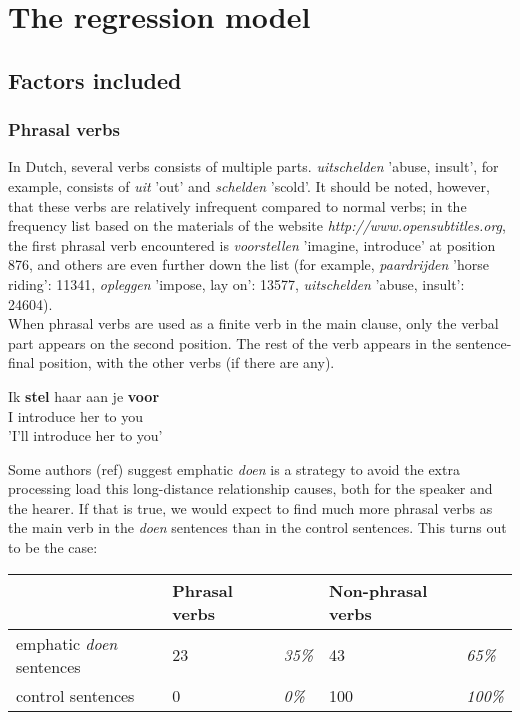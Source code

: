 \documentclass[12pt]{article}
\begin{document}
\section{The regression model} \label{regression}

\subsection{Factors included}

\subsubsection{Phrasal verbs}
In Dutch, several verbs consists of multiple parts. \emph{uitschelden} 'abuse, insult', for example, consists of \emph{uit} 'out' and \emph{schelden} 'scold'. It should be noted, however, that these verbs are relatively infrequent compared to normal verbs; in the frequency list based on the materials of the website \emph{http://www.opensubtitles.org}, the first phrasal verb encountered is \emph{voorstellen} 'imagine, introduce' at position 876, and others are even further down the list (for example, \emph{paardrijden} 'horse riding': 11341, \emph{opleggen} 'impose, lay on': 13577, \emph{uitschelden} 'abuse, insult': 24604).\\\indent
When phrasal verbs are used as a finite verb in the main clause, only the verbal part appears on the second position. The rest of the verb appears in the sentence-final position, with the other verbs (if there are any).

\begin{exe}
\ex \gll Ik \textbf{stel} haar aan je \textbf{voor}\\
I introduce her to you\\
'I'll introduce her to you'
\end{exe}

Some authors (ref) suggest emphatic \emph{doen} is a strategy to avoid the extra processing load this long-distance relationship causes, both for the speaker and the hearer. If that is true, we would expect to find much more phrasal verbs as the main verb in the \emph{doen} sentences than in the control sentences. This turns out to be the case:


\begin{table}[h]
\begin{tabular}{|l|ll|ll|}
\hline
&Phrasal verbs&&Non-phrasal verbs&\\
\hline
emphatic \emph{doen} sentences	&23 	& \emph{35\%}	&43		 &\emph{65\%}\\
control sentences				&0		& \emph{0\%}	&100	 &\emph{100\%}\\
\hline
\end{tabular}
\end{table}
\end{document}
